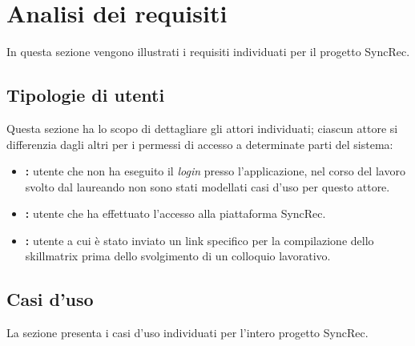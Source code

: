 
\chapter{Analisi dei requisiti}
\label{cap:descrizione-stage}
In questa sezione vengono illustrati i requisiti individuati per il progetto SyncRec.

\section{Tipologie di utenti}
Questa sezione ha lo scopo di dettagliare gli attori individuati; ciascun attore si differenzia dagli altri per i permessi di accesso a determinate parti del sistema:
\begin{itemize}	
	\item \textbf{\nonlogged:} utente che non ha eseguito il \textit{login} presso l'applicazione, nel corso del lavoro svolto dal laureando non sono stati modellati casi d'uso per questo attore.
	\item \textbf{\loggedusr:} utente che ha effettuato l'accesso alla piattaforma SyncRec.
	\item \textbf{\applicant:} utente a cui è stato inviato un link specifico per la compilazione dello skillmatrix prima dello svolgimento di un colloquio lavorativo. 
\end{itemize}

\section{Casi d'uso}
La sezione presenta i casi d'uso individuati per l'intero progetto SyncRec.

